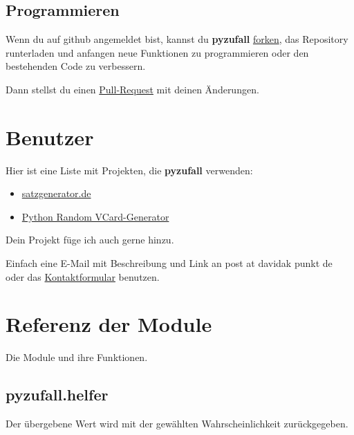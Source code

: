 \documentclass[a4paper,12pt,oneside]{sphinxmanual}
\begin{document}
\section{Programmieren}
\label{beitragen:programmieren}
Wenn du auf github angemeldet bist, kannst du \textbf{pyzufall} \href{https://help.github.com/articles/fork-a-repo}{forken}, das Repository runterladen und anfangen neue Funktionen zu programmieren oder den bestehenden Code zu verbessern.

Dann stellst du einen \href{https://help.github.com/articles/creating-a-pull-request}{Pull-Request} mit deinen Änderungen.


\chapter{Benutzer}
\label{benutzer::doc}\label{benutzer:benutzer}
Hier ist eine Liste mit Projekten, die \textbf{pyzufall} verwenden:
\begin{itemize}
\item {} 
\href{http://satzgenerator.de/}{satzgenerator.de}

\item {} 
\href{https://github.com/davidak/python-random-vcard-generator}{Python Random VCard-Generator}

\end{itemize}

Dein Projekt füge ich auch gerne hinzu.

Einfach eine E-Mail mit Beschreibung und Link an post at davidak punkt de oder das \href{http://davidak.de/kontakt}{Kontaktformular} benutzen.


\chapter{Referenz der Module}
\label{module:referenz-der-module}\label{module::doc}
Die Module und ihre Funktionen.


\section{pyzufall.helfer}
\label{module:pyzufall-helfer}\label{module:module-pyzufall.helfer}

\begin{fulllineitems}
\label{module:pyzufall.helfer.chance}
Der übergebene Wert wird mit der gewählten Wahrscheinlichkeit zurückgegeben.

\end{fulllineitems}
\end{document}
